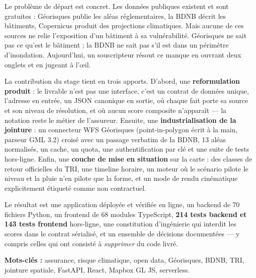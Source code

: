 \documentclass[11pt,a4paper,oneside]{report}
\begin{document}
Le problème de départ est concret. Les données publiques existent et sont
gratuites : Géorisques publie les aléas réglementaires, la BDNB décrit les
bâtiments, Copernicus produit des projections climatiques. Mais aucune de ces
sources ne relie l'exposition d'un bâtiment à sa vulnérabilité. Géorisques ne
sait pas ce qu'est le bâtiment ; la BDNB ne sait pas s'il est dans un périmètre
d'inondation. Aujourd'hui, un souscripteur résout ce manque en ouvrant deux
onglets et en jugeant à l'œil.

La contribution du stage tient en trois apports. D'abord, une
\textbf{reformulation produit} : le livrable n'est pas une interface, c'est un
contrat de données unique, l'adresse en entrée, un JSON canonique en sortie, où
chaque fait porte sa source et son niveau de résolution, et où aucun score
composite n'apparaît — la notation reste le métier de l'assureur. Ensuite, une
\textbf{industrialisation de la jointure} : un connecteur WFS Géorisques
(point-in-polygon écrit à la main, parseur GML 3.2) croisé avec un passage
verbatim de la BDNB, 13 aléas normalisés, un cache, un quota, une
authentification par clé et une suite de tests hors-ligne. Enfin, une
\textbf{couche de mise en situation} sur la carte : des classes de retour
officielles du TRI, une timeline horaire, un moteur où le scénario pilote le
niveau et la pluie n'en pilote que la forme, et un mode de rendu cinématique
explicitement étiqueté comme non contractuel.

Le résultat est une application déployée et vérifiée en ligne, un backend de
70 fichiers Python, un frontend de 68 modules TypeScript, \textbf{214 tests
backend et 143 tests frontend} hors-ligne, une constitution d'ingénierie qui
interdit les scores dans le contrat sérialisé, et un ensemble de décisions
documentées — y compris celles qui ont consisté à \emph{supprimer} du code
livré.

\vspace{1em}
\noindent\textbf{Mots-clés :} assurance, risque climatique, open data,
Géorisques, BDNB, TRI, jointure spatiale, FastAPI, React, Mapbox GL JS,
serverless.

\clearpage


\clearpage

\tableofcontents
\clearpage
\listoffigures
\clearpage
\listoftables
\clearpage














\end{document}
